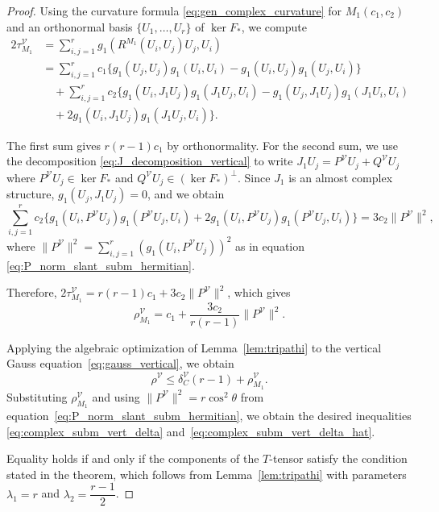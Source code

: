 \documentclass[11pt]{amsart}
\theoremstyle{plain}
\theoremstyle{definition}
\theoremstyle{remark}
\newcommand{\calV}{\mathcal{V}}
\begin{document}
\begin{proof}
Using the curvature formula \eqref{eq:gen_complex_curvature} for $M_1(c_1,c_2)$ and an orthonormal basis $\{U_1,\ldots,U_r\}$ of $\ker F_*$, we compute
\begin{align*}
2\tau_{M_1}^{\calV} &= \sum_{i,j=1}^r g_1(R^{M_1}(U_i,U_j)U_j,U_i)\\
&= \sum_{i,j=1}^r c_1\{g_1(U_j,U_j)g_1(U_i,U_i) - g_1(U_i,U_j)g_1(U_j,U_i)\}\\
&\quad + \sum_{i,j=1}^r c_2\{g_1(U_i, J_1U_j)g_1(J_1U_j, U_i) - g_1(U_j, J_1U_j)g_1(J_1U_i, U_i)\\
&\quad + 2g_1(U_i, J_1U_j)g_1(J_1U_j, U_i)\}.
\end{align*}

The first sum gives $r(r-1)c_1$ by orthonormality. For the second sum, we use the decomposition \eqref{eq:J_decomposition_vertical} to write $J_1U_j = P^{\mathcal V}U_j + Q^{\mathcal V}U_j$ where $P^{\mathcal V}U_j \in \ker F_*$ and $Q^{\mathcal V}U_j \in (\ker F_*)^\perp$. Since $J_1$ is an almost complex structure, $g_1(U_j, J_1U_j) = 0$, and we obtain
\[\sum_{i,j=1}^r c_2\{g_1(U_i, P^{\mathcal V}U_j)g_1(P^{\mathcal V}U_j, U_i) + 2g_1(U_i, P^{\mathcal V}U_j)g_1(P^{\mathcal V}U_j, U_i)\} = 3c_2\|P^{\mathcal V}\|^2,\]
where $\|P^{\mathcal V}\|^2 = \sum_{i,j=1}^r (g_1(U_i, P^{\mathcal V}U_j))^2$ as in equation \eqref{eq:P_norm_slant_subm_hermitian}.

Therefore, $2\tau_{M_1}^{\calV} = r(r-1)c_1 + 3c_2\|P^{\mathcal V}\|^2$, which gives
\[\rho_{M_1}^{\calV} = c_1 + \dfrac{3c_2}{r(r-1)}\|P^{\mathcal V}\|^2.\]

Applying the algebraic optimization of Lemma~\ref{lem:tripathi}
to the vertical Gauss equation~\eqref{eq:gauss_vertical}, we obtain
\[
\rho^{\calV} \leq \delta_C^{\calV}(r-1) + \rho_{M_1}^{\calV}.
\]
Substituting $\rho_{M_1}^{\calV}$ and using 
$\|P^{\calV}\|^2 = r\cos^2\theta$ from 
equation~\eqref{eq:P_norm_slant_subm_hermitian}, 
we obtain the desired inequalities 
\eqref{eq:complex_subm_vert_delta} 
and~\eqref{eq:complex_subm_vert_delta_hat}.

\medskip
Equality holds if and only if the components of the $T$-tensor satisfy the condition stated in the theorem, which follows from Lemma~\ref{lem:tripathi} with parameters $\lambda_1 = r$ and $\lambda_2 = \dfrac{r-1}{2}$.
\end{proof}
\end{document}
